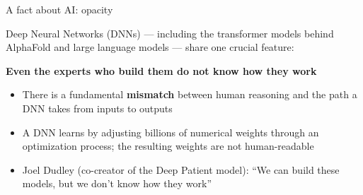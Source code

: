 \documentclass[fleql]{beamer}
\newcommand{\kw}[1]{\textbf{#1}}
\begin{document}
\begin{frame}{A fact about AI: opacity}

  Deep Neural Networks (DNNs) --- including the transformer models
  behind AlphaFold and large language models --- share one crucial
  feature:

  \vspace{0.5em}
  \begin{center}
  \kw{Even the experts who build them do not know how they work}
  \end{center}

  \vspace{0.5em}
  \begin{itemize}
  \item There is a fundamental \kw{mismatch} between human reasoning
    and the path a DNN takes from inputs to outputs
  \item A DNN learns by adjusting billions of numerical weights
    through an optimization process; the resulting weights
    are not human-readable
  \item Joel Dudley (co-creator of the Deep Patient model):
    ``We can build these models, but we don't know how they work''
  \end{itemize}

\end{frame}
\end{document}
